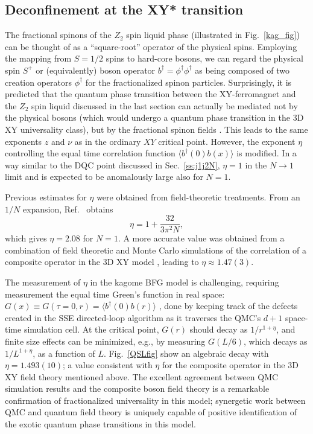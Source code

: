 \documentclass[range]{ar2e}
\begin{document}
\subsection{Deconfinement at the XY* transition} \label{XYstar}

The fractional spinons of the $Z_2$ spin liquid phase (illustrated in Fig.~\ref{kag_fig}) can be thought of as a ``square-root'' operator of the physical spins.  Employing the mapping from $S=1/2$ spins to hard-core bosons, we can regard the physical spin $S^+$ or (equivalently) boson operator $b^{\dagger}=\phi^\dagger\phi^\dagger$ as being composed of two creation
operators $\phi^\dagger$ for the fractionalized spinon particles.  Surprisingly, it is predicted that the quantum phase transition between the XY-ferromagnet 
and the $Z_2$ spin liquid discussed in the last section can actually be mediated not by the physical bosons (which would undergo a quantum phase transition in the 3D XY universality class), but by the fractional spinon fields \cite{XYstar1,XYstar2,earlyXYstar}.  This leads to the same exponents $z$ and $\nu$ as in the ordinary $XY$ critical point.  However, the exponent $\eta$ controlling the equal time correlation function $\langle b^\dagger(0) b(x) \rangle$ 
is modified. In a way similar to the DQC point discussed in Sec.~\ref{ss:j1j2N}, $\eta=1$ in the $N\to 1$ limit and is expected to be anomalously large also for $N=1$.

Previous estimates for $\eta$ were obtained from field-theoretic treatments. From an $1/N$ expansion, Ref.~\cite{XYstar2} obtains
\begin{equation}
\eta = 1 + \frac{32}{3 \pi^2 N},
\end{equation}
which gives $\eta = 2.08$ for $N=1$.
A more accurate value was obtained from a combination of field theoretic and Monte Carlo simulations of the correlation of a composite operator in the 3D XY model \cite{compositefieldtheory,compositeMC}, leading to $\eta\approx  1.47(3)$.

The measurement of $\eta$ in the kagome BFG model is challenging, requiring measurement the equal time Green's function in real space: 
$G(x)\equiv G(\tau=0,r) = \langle b^\dagger(0) b(r) \rangle$ \cite{WormA,gfsse}, done by keeping track of the defects created in the SSE directed-loop algorithm \cite{Syljuasen02} 
as it traverses the QMC's $d+1$ space-time simulation cell.  At the critical point, $G(r)$ should decay as $1/r^{1+\eta}$, and finite size effects can be minimized, e.g., by measuring $G(L/6)$, which decays as $1/L^{1+\eta}$, as a function of $L$.  Fig.~\ref{QSLfig} show an algebraic decay with $\eta=1.493(10)$; a value consistent with $\eta$ for the composite operator in the 3D XY field theory mentioned above.  The excellent agreement between QMC simulation results and the composite boson field theory is a remarkable confirmation of fractionalized universality in this model; synergetic work between QMC and quantum field theory is uniquely capable of positive identification of the exotic quantum phase transitions in this model.
\end{document}
